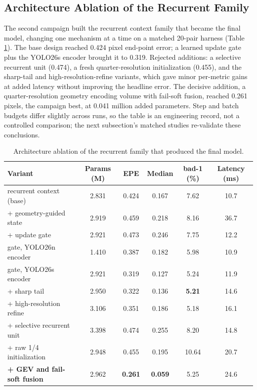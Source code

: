 \subsection{Architecture Ablation of the Recurrent Family}
The second campaign built the recurrent context family that became the
final model, changing one mechanism at a time on a matched 20-pair
harness (Table \ref{tab:ablation_gev4line}). The base design reached
0.424 pixel end-point error; a learned update gate plus the YOLO26s
encoder brought it to 0.319. Rejected additions: a selective recurrent
unit (0.474), a fresh quarter-resolution initialization (0.455), and
the sharp-tail and high-resolution-refine variants, which gave minor
per-metric gains at added latency without improving the headline
error. The decisive addition, a quarter-resolution geometry encoding
volume with fail-soft fusion, reached 0.261 pixels, the campaign best,
at 0.041 million added parameters. Step and batch budgets differ
slightly across runs, so the table is an engineering record, not a
controlled comparison; the next subsection's matched studies
re-validate these conclusions.

\begin{table}[!htbp]
\centering
\caption{Architecture ablation of the recurrent family that produced the final model.}
\label{tab:ablation_gev4line}
\small
\begin{tabular}{lccccc}
\toprule
Variant & Params (M) & EPE & Median & bad-1 (\%) & Latency (ms)\\
\midrule
recurrent context (base) & 2.831 & 0.424 & 0.167 & 7.62 & 10.7\\
+ geometry-guided state & 2.919 & 0.459 & 0.218 & 8.16 & 36.7\\
+ update gate & 2.921 & 0.473 & 0.246 & 7.75 & 12.2\\
gate, YOLO26n encoder & 1.410 & 0.387 & 0.182 & 5.98 & 10.9\\
gate, YOLO26s encoder & 2.921 & 0.319 & 0.127 & 5.24 & 11.9\\
+ sharp tail & 2.950 & 0.322 & 0.136 & \textbf{5.21} & 14.6\\
+ high-resolution refine & 3.106 & 0.351 & 0.186 & 5.18 & 16.1\\
+ selective recurrent unit & 3.398 & 0.474 & 0.255 & 8.20 & 14.8\\
+ raw 1/4 initialization & 2.948 & 0.455 & 0.195 & 10.64 & 20.7\\
\textbf{+ GEV and fail-soft fusion} & 2.962 & \textbf{0.261} & \textbf{0.059} & 5.25 & 24.6\\
\bottomrule
\end{tabular}
\end{table}


